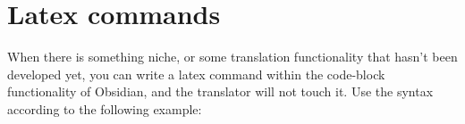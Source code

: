 \documentclass{doc_class_fontsize}{extarticle}
\begin{document}




\section{Latex commands}

When there is something niche, or some translation functionality that hasn't been developed yet, you can write a latex command within the code-block functionality of Obsidian, and the translator will not touch it. Use the syntax according to the following example:





\lipsum[1-4]




\newpage


\newpage




\end{document}
